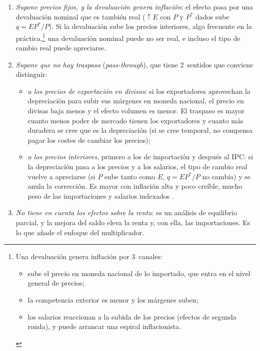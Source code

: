 \documentclass[11pt]{article}
\begin{document}
\begin{itemize}
\begin{enumerate}
  \item \emph{Supone precios fijos, y la devaluación genera inflación}: el efecto pasa por una devaluación nominal que es también real ($\uparrow E$ con $P$ y $P^*$ dados sube $q=EP^*/P$). Si la devaluación sube los precios interiores, algo frecuente en la práctica,\footnote{Una devaluación genera inflación por 3~canales:
\begin{itemize}
\item sube el precio en moneda nacional de lo importado, que entra en el nivel general de precios;
\item la competencia exterior es menor y los márgenes suben;
\item los salarios reaccionan a la subida de los precios (efectos de segunda ronda), y puede arrancar una espiral inflacionista.
\end{itemize}} una devaluación nominal puede no ser real, e incluso el tipo de cambio real puede apreciarse.
  \item \emph{Supone que no hay traspaso} (\emph{pass-through}), que tiene 2~sentidos que conviene distinguir:
    \begin{itemize}
    \item \emph{a los precios de exportación en divisas}: si los exportadores aprovechan la depreciación para subir sus márgenes en moneda nacional, el precio en divisas baja menos y el efecto volumen es menor. El traspaso es mayor cuanto menos poder de mercado tienen los exportadores y cuanto más duradera se cree que es la depreciación (si se cree temporal, no compensa pagar los costes de cambiar los precios);
    \item \emph{a los precios interiores}, primero a los de importación y después al IPC: si la depreciación pasa a los precios y a los salarios, el tipo de cambio real vuelve a apreciarse (si $P$ sube tanto como $E$, $q=EP^*/P$ no cambia) y se anula la corrección. Es mayor con inflación alta y poco creíble, mucho peso de las importaciones y salarios indexados\nocite{Taylor2000PassThrough,CampaGoldberg2005,BursteinGopinath2014} .
    \end{itemize}
  \item \emph{No tiene en cuenta los efectos sobre la renta}: es un análisis de equilibrio parcial, y la mejora del saldo eleva la renta y, con ella, las importaciones. Es lo que añade el enfoque del multiplicador.
  \end{enumerate}
\end{itemize}
\end{document}
